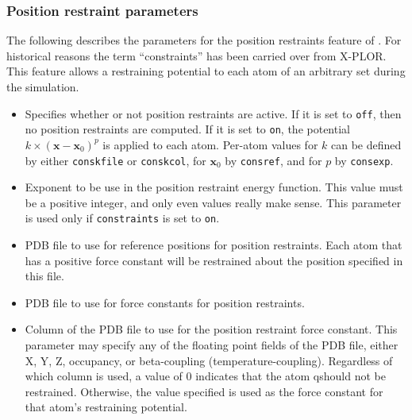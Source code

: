 \subsubsection{Position restraint parameters}

The following describes the parameters for the position restraints feature of \NAMD.
For historical reasons the term ``constraints'' has been carried over from X-PLOR.
This feature allows a restraining potential to each atom of an arbitrary set during the simulation.

\begin{itemize}

\item
{}
{Specifies whether or not position restraints are active.
If it is set to {\tt off}, then no position restraints are computed.
If it is set to {\tt on}, the potential $k\times(\mathbf{x} - \mathbf{x}_0)^p$ is applied to each atom.
Per-atom values for $k$ can be defined by either {\tt conskfile} or {\tt conskcol}, for $\mathbf{x}_0$ by {\tt consref}, and for $p$ by {\tt consexp}.
}

\item
{}
{Exponent to be use in the position restraint energy function.
This value must be a positive integer, and only even values really make 
sense.  This parameter is used only if {\tt constraints} is set to 
{\tt on}.}

\item
{}
{PDB file to use for reference positions for position restraints.
Each atom that has a positive force constant will be restrained about the position specified in this file.}

\item
{}
{PDB file to use for force constants for 
position restraints.}

\item
{}
{Column of the PDB file to use for the position restraint force constant.
This parameter may specify any of the floating point fields of the PDB file, 
either X, Y, Z, occupancy, or beta-coupling (temperature-coupling).
Regardless of which column is used, a value of 0 indicates that the atom 
qshould not be restrained.
Otherwise, the value specified is used as the force constant for 
that atom's restraining potential.}


\end{itemize}
